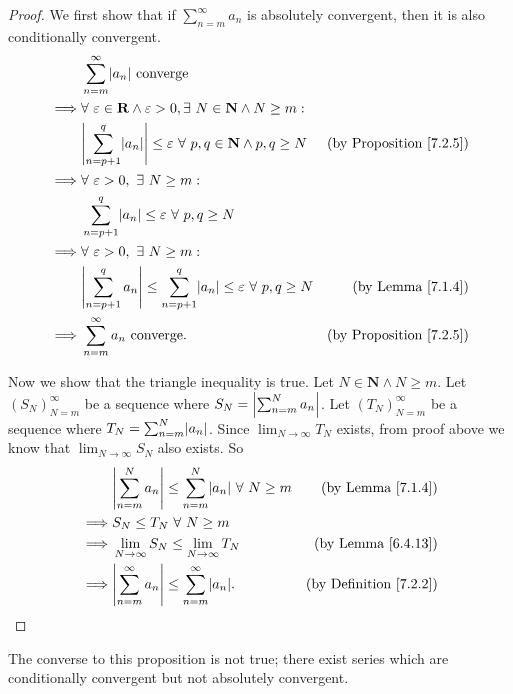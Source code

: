 \begin{proof}
We first show that if \(\sum_{n = m}^\infty a_n\) is absolutely convergent, then it is also conditionally convergent.
\begin{align*}
& \sum_{n = m}^\infty \abs*{a_n} \text{ converge} \\
\implies & \forall\ \varepsilon \in \mathbf{R} \land \varepsilon > 0, \exists\ N \in \mathbf{N} \land N \geq m : \\
& \abs*{\sum_{n = p + 1}^q \abs*{a_n}} \leq \varepsilon\ \forall\ p, q \in \mathbf{N} \land p, q \geq N & \text{(by Proposition \ref{7.2.5})} \\
\implies & \forall\ \varepsilon > 0, \ \exists\ N \geq m : \\
& \sum_{n = p + 1}^q \abs*{a_n} \leq \varepsilon\ \forall\ p, q \geq N \\
\implies & \forall\ \varepsilon > 0, \ \exists\ N \geq m : \\
& \abs*{\sum_{n = p + 1}^q a_n} \leq \sum_{n = p + 1}^q \abs*{a_n} \leq \varepsilon\ \forall\ p, q \geq N & \text{(by Lemma \ref{7.1.4})} \\
\implies & \sum_{n = m}^\infty a_n \text{ converge}. & \text{(by Proposition \ref{7.2.5})}
\end{align*}

Now we show that the triangle inequality is true.
Let \(N \in \mathbf{N} \land N \geq m\).
Let \((S_N)_{N = m}^\infty\) be a sequence where \(S_N = \abs*{\sum_{n = m}^N a_n}\).
Let \((T_N)_{N = m}^\infty\) be a sequence where \(T_N = \sum_{n = m}^N \abs*{a_n}\).
Since \(\lim_{N \to \infty} T_N\) exists, from proof above we know that \(\lim_{N \to \infty} S_N\) also exists.
So
\begin{align*}
& \abs*{\sum_{n = m}^N a_n} \leq \sum_{n = m}^N \abs*{a_n} \ \forall\ N \geq m & \text{(by Lemma \ref{7.1.4})} \\
\implies & S_N \leq T_N \ \forall\ N \geq m \\
\implies & \lim_{N \to \infty} S_N \leq \lim_{N \to \infty} T_N & \text{(by Lemma \ref{6.4.13})} \\
\implies & \abs*{\sum_{n = m}^\infty a_n} \leq \sum_{n = m}^\infty \abs*{a_n}. & \text{(by Definition \ref{7.2.2})}
\end{align*}
\end{proof}

\begin{remark}\label{7.2.10}
The converse to this proposition is not true;
there exist series which are conditionally convergent but not absolutely convergent.
\end{remark}


